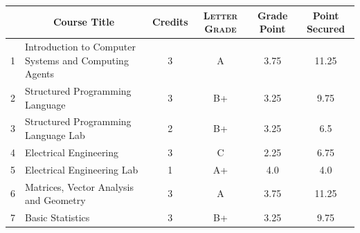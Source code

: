 \documentclass[11pt]{article}
\newcommand*{\numtwo}[1]{\pgfmathprintnumber[
                    fixed, precision=2, fixed zerofill=true]{#1}}
\begin{document}
                \begin{center}
                    \renewcommand{\arraystretch}{1.08}
                    
                \begin{tabular}{|c|l|c|>{\scshape}c|c|c|}
                \hline  \rule[-1ex]{0pt}{3.5ex} {\centering{\bf Course Code}} &  \multicolumn{1}{c|}{\textbf{Course Title}}  & {\bf Credits} & {\bf Letter Grade} & {\bf Grade Point} & {\bf Point Secured}  \\ 
                \hline   1 &  Introduction to Computer Systems and Computing Agents		 & 3 & A & 3.75 & 11.25 \\ %
                \hline   2 &  Structured Programming Language		 & 3 & B+ & 3.25 & 9.75 \\ %
                \hline   3 &  Structured Programming Language Lab		 & 2 & B+ & 3.25 & 6.5 \\ %
                \hline   4 &  Electrical Engineering		 & 3 & C & 2.25 & 6.75 \\ %
                \hline   5 &  Electrical Engineering Lab		 & 1 & A+ & 4.0 & 4.0 \\ %
                \hline   6 &  Matrices, Vector Analysis and Geometry		 & 3 & A & 3.75 & 11.25 \\ %
                \hline   7 &  Basic Statistics		 & 3 & B+ & 3.25 & 9.75 \\ %

\hline                %
                \end{tabular}
                \end{center}
                \renewcommand{\arraystretch}{1.03}
\end{document}
